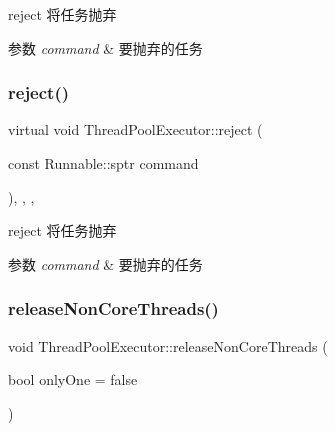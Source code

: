 reject 将任务抛弃 


\begin{DoxyParams}{参数}
{\em command} & 要抛弃的任务 \\
\hline
\end{DoxyParams}
\mbox{\label{classThreadPoolExecutor_a353e65b77bb3c0950ed79939473d4852}} 
\subsubsection{\texorpdfstring{reject()}{reject()}\hspace{0.1cm}{\footnotesize\ttfamily [2/2]}}
{\footnotesize\ttfamily virtual void Thread\+Pool\+Executor\+::reject (\begin{DoxyParamCaption}\item[{const Runnable\+::sptr}]{command }\end{DoxyParamCaption})\hspace{0.3cm}{\ttfamily [inline]}, {\ttfamily [final]}, {\ttfamily [protected]}, {\ttfamily [virtual]}}



reject 将任务抛弃 


\begin{DoxyParams}{参数}
{\em command} & 要抛弃的任务 \\
\hline
\end{DoxyParams}
\mbox{\label{classThreadPoolExecutor_a5d2d340118dd847534533f8bf2e9ae94}} 
\subsubsection{\texorpdfstring{release\+Non\+Core\+Threads()}{releaseNonCoreThreads()}}
{\footnotesize\ttfamily void Thread\+Pool\+Executor\+::release\+Non\+Core\+Threads (\begin{DoxyParamCaption}\item[{bool}]{only\+One = {\ttfamily false} }\end{DoxyParamCaption})}



